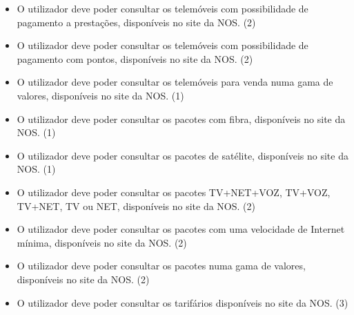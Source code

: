 \documentclass[11pt,a4paper]{article}
\newcommand{\requirement}[3]{
    #1 (#3)
}
\begin{document}
\begin{appendices}
\begin{itemize}
    \item \requirement{O utilizador deve poder consultar os telemóveis com possibilidade de pagamento a prestações, disponíveis no site da NOS.}
    {A consulta dos telemóveis com possibilidade de pagamento a prestações leva os utilizadores a comprarem telemóveis de qualidade superior.}{2}
    \item \requirement{O utilizador deve poder consultar os telemóveis com possibilidade de pagamento com pontos, disponíveis no site da NOS.}
    {A consulta dos telemóveis com possibilidade de pagamento com pontos leva os utilizadores a comprarem telemóveis de qualidade superior.}{2}
    \item \requirement{O utilizador deve poder consultar os telemóveis para venda numa gama de valores, disponíveis no site da NOS.}
    {A consulta dos telemóveis em intervalos de preço permite aos utilizadores efetuar uma pesquisa adequada ao seu orçamento.}{1}
    \item \requirement{O utilizador deve poder consultar os pacotes com fibra, disponíveis no site da NOS.}
    {A consulta dos pacotes com fibra permite ao utilizador restringir a consulta ao tipo de ligação conveniente.}{1}
    \item \requirement{O utilizador deve poder consultar os pacotes de satélite, disponíveis no site da NOS.}
    {A consulta dos pacotes de satélite permite ao utilizador restringir a consulta ao tipo de ligação conveniente.}{1}
    \item \requirement{O utilizador deve poder consultar os pacotes TV+NET+VOZ, TV+VOZ, TV+NET, TV ou NET, disponíveis no site da NOS.}
    {A consulta dos pacotes por tipo de serviços oferecidos permite ao utilizador restringir a sua consulta a pacotes com serviços desejados.}{2}
    \item \requirement{O utilizador deve poder consultar os pacotes com uma velocidade de Internet mínima, disponíveis no site da NOS.}
    {A consulta dos pacotes com uma velocidade de Internet mínima permite ao utilizador restringir a sua consulta a pacotes com velocidade desejada.}{2}
    \item \requirement{O utilizador deve poder consultar os pacotes numa gama de valores, disponíveis no site da NOS.}{A consulta dos pacotes em intervalos de preço permite aos utilizadores efetuar uma pesquisa adequada ao seu orçamento.}{2}
    \item \requirement{O utilizador deve poder consultar os tarifários disponíveis no site da NOS.}{A consulta dos diferentes tarifários permite ao utilizador tomar conhecimento de toda a oferta e fazer uma escolha consciente.}{3}

\end{itemize}
\end{appendices}
\end{document}
